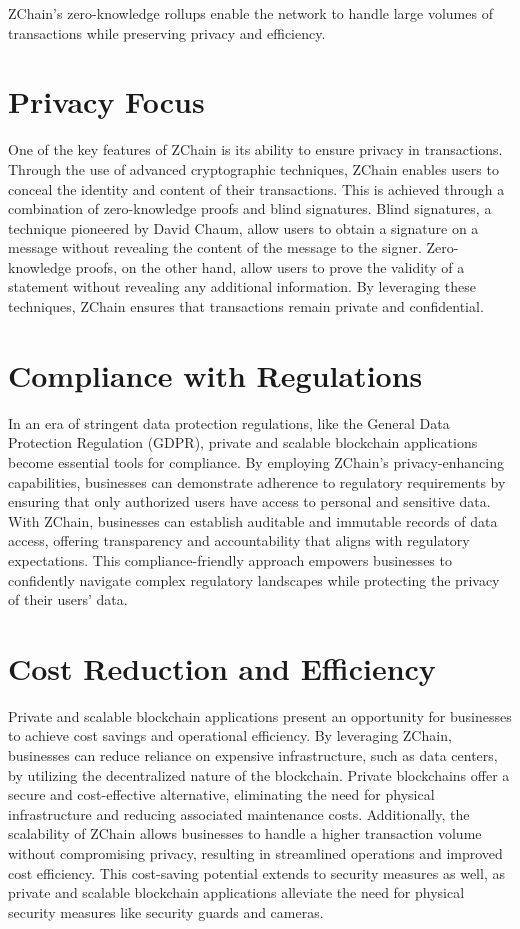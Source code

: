 \documentclass[11pt]{article}
\begin{document}
ZChain's zero-knowledge rollups enable the network to handle large volumes of transactions while preserving privacy and efficiency.


\section{Privacy Focus}

One of the key features of ZChain is its ability to ensure privacy in transactions. Through the use of advanced cryptographic techniques, ZChain enables users to conceal the identity and content of their transactions. This is achieved through a combination of zero-knowledge proofs and blind signatures. Blind signatures, a technique pioneered by David Chaum, allow users to obtain a signature on a message without revealing the content of the message to the signer. Zero-knowledge proofs, on the other hand, allow users to prove the validity of a statement without revealing any additional information. By leveraging these techniques, ZChain ensures that transactions remain private and confidential.


\section{Compliance with Regulations}

In an era of stringent data protection regulations, like the General Data Protection Regulation (GDPR), private and scalable blockchain applications become essential tools for compliance. By employing ZChain's privacy-enhancing capabilities, businesses can demonstrate adherence to regulatory requirements by ensuring that only authorized users have access to personal and sensitive data. With ZChain, businesses can establish auditable and immutable records of data access, offering transparency and accountability that aligns with regulatory expectations. This compliance-friendly approach empowers businesses to confidently navigate complex regulatory landscapes while protecting the privacy of their users' data.


\section{Cost Reduction and Efficiency}

Private and scalable blockchain applications present an opportunity for businesses to achieve cost savings and operational efficiency. By leveraging ZChain, businesses can reduce reliance on expensive infrastructure, such as data centers, by utilizing the decentralized nature of the blockchain. Private blockchains offer a secure and cost-effective alternative, eliminating the need for physical infrastructure and reducing associated maintenance costs. Additionally, the scalability of ZChain allows businesses to handle a higher transaction volume without compromising privacy, resulting in streamlined operations and improved cost efficiency. This cost-saving potential extends to security measures as well, as private and scalable blockchain applications alleviate the need for physical security measures like security guards and cameras.
\end{document}
